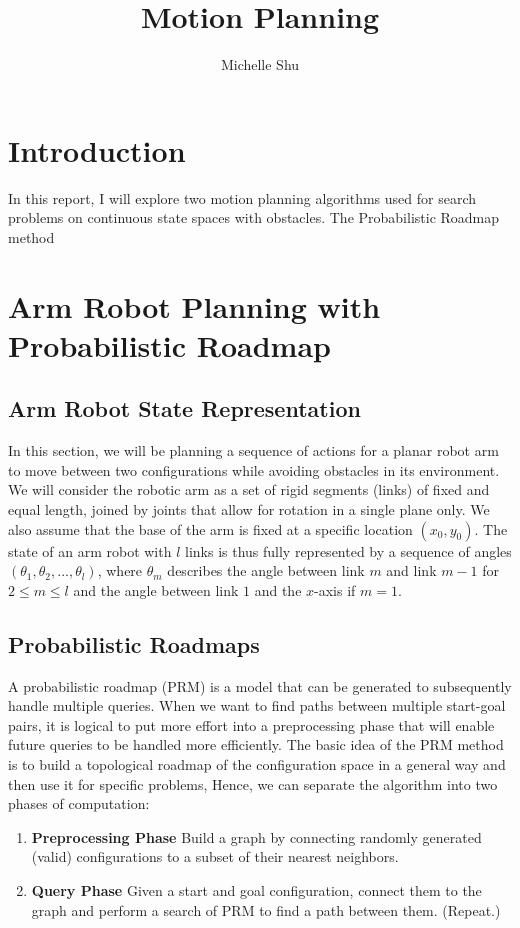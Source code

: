 \documentclass{article}
\title{Motion Planning}
\author{Michelle Shu}
\begin{document}
\maketitle

\section{Introduction}

In this report, I will explore two motion planning algorithms used for search problems on continuous state spaces with obstacles. The Probabilistic Roadmap method 

\section{Arm Robot Planning with Probabilistic Roadmap}

\subsection{Arm Robot State Representation}
In this section, we will be planning a sequence of actions for a planar robot arm to move between two configurations while avoiding obstacles in its environment. We will consider the robotic arm as a set of rigid segments (links) of fixed and equal length, joined by joints that allow for rotation in a single plane only. We also assume that the base of the arm is fixed at a specific location $(x_0, y_0)$. The state of an arm robot with $l$ links is thus fully represented by a sequence of angles $(\theta_1,  \theta_2, ..., \theta_l)$, where $\theta_m$ describes the angle between link $m$ and link $m - 1$ for $2 \le m \le l$ and the angle between link $1$ and the $x$-axis if $m = 1$.

\subsection{Probabilistic Roadmaps}
A probabilistic roadmap (PRM) is a model that can be generated to subsequently handle multiple queries. When we want to find paths between multiple start-goal pairs, it is logical to put more effort into a preprocessing phase that will enable future queries to be handled more efficiently. The basic idea of the PRM method is to build a topological roadmap of the configuration space in a general way and then use it for specific problems, Hence, we can separate the algorithm into two phases of computation:

\begin{enumerate}
\item {\bf Preprocessing Phase} Build a graph by connecting randomly generated (valid) configurations to a subset of their nearest neighbors.
\item {\bf Query Phase} Given a start and goal configuration, connect them to the graph and perform a search of PRM to find a path between them. (Repeat.)
\end{enumerate}
\end{document}
